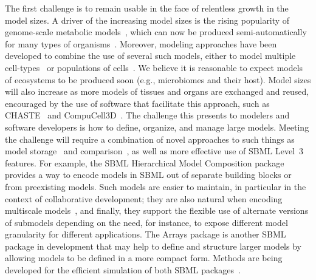 \documentclass[]{draft-sbml-paper}
\begin{document}
The first challenge is to remain usable in the face of relentless growth in the model sizes.  A driver of the increasing model sizes is the rising popularity of genome-scale metabolic models~\citep{Bordbar2014a}, which can now be produced semi-automatically for many types of organisms~\citep{henry2010high, buchel2013path2models, Magnusdottir2017}. Moreover, modeling approaches have been developed to combine the use of several such models, either to model multiple cell-types~\citep{bordbar2011multi} or populations of cells~\citep{damiani2017popfba}. We believe it is reasonable to expect models of ecosystems to be produced soon (e.g., microbiomes and their host). Model sizes will also increase as more models of tissues and organs are exchanged and reused, encouraged by the use of software that facilitate this approach, such as CHASTE~\citep{mirams2013chaste} and CompuCell3D~\citep{swat2012multi}.  The challenge this presents to modelers and software developers is how to define, organize, and manage large models.  Meeting the challenge will require a combination of novel approaches to such things as model storage~\citep[e.g.,][]{Henkel2015combininga} and comparison~\citep[e.g.,][]{Scharm2016algorithm, Scharm2016comodi}, as well as more effective use of SBML Level~3 features.  For example, the SBML Hierarchical Model Composition package~\citep{Smith2015} provides a way to encode models in SBML out of separate building blocks or from preexisting models.  Such models are easier to maintain, in particular in the context of collaborative development; they are also natural when encoding multiscale models~\citep{chew2014multiscale}, and finally, they support the flexible use of alternate versions of submodels depending on the need, for instance, to expose different model granularity for different applications.  The Arrays package is another SBML package in development that may help to define and structure larger models by allowing models to be defined in a more compact form.  Methods are being developed for the efficient simulation of both SBML packages~\citep{watanabe2014hierarchical, watanabe2016efficient}.
\end{document}
